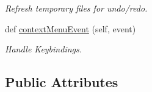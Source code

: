 \begin{DoxyCompactItemize}
\begin{DoxyCompactList}\small\item\em Refresh temporary files for undo/redo. \end{DoxyCompactList}\item 
\mbox{\label{classInterface_1_1Window_a79ab46192a86366e20795f4929122535}} 
def \mbox{\hyperlink{classInterface_1_1Window_a79ab46192a86366e20795f4929122535}{context\+Menu\+Event}} (self, event)
\begin{DoxyCompactList}\small\item\em Handle Keybindings. \end{DoxyCompactList}\end{DoxyCompactItemize}
\subsection*{Public Attributes}
